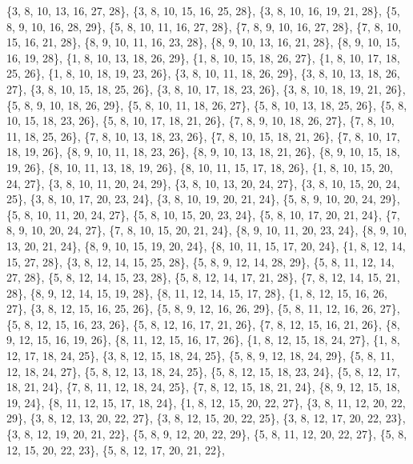 \documentclass[11pt,a4paper]{article}
\begin{document}
{\{3, 8, 10, 13, 16, 27, 28\}, \{3, 8, 10, 15, 16, 25, 28\}, \{3, 8, 10, 16, 19, 21, 28\}, \{5, 8, 9, 10, 16, 28, 29\}, \{5, 8, 10, 11, 16, 27, 28\},
\{7, 8, 9, 10, 16, 27, 28\}, \{7, 8, 10, 15, 16, 21, 28\}, \{8, 9, 10, 11, 16, 23, 28\}, \{8, 9, 10, 13, 16, 21, 28\}, \{8, 9, 10, 15, 16, 19, 28\},
\{1, 8, 10, 13, 18, 26, 29\}, \{1, 8, 10, 15, 18, 26, 27\}, \{1, 8, 10, 17, 18, 25, 26\}, \{1, 8, 10, 18, 19, 23, 26\}, \{3, 8, 10, 11, 18, 26, 29\},
\{3, 8, 10, 13, 18, 26, 27\}, \{3, 8, 10, 15, 18, 25, 26\}, \{3, 8, 10, 17, 18, 23, 26\}, \{3, 8, 10, 18, 19, 21, 26\}, \{5, 8, 9, 10, 18, 26, 29\},
\{5, 8, 10, 11, 18, 26, 27\}, \{5, 8, 10, 13, 18, 25, 26\}, \{5, 8, 10, 15, 18, 23, 26\}, \{5, 8, 10, 17, 18, 21, 26\}, \{7, 8, 9, 10, 18, 26, 27\},
\{7, 8, 10, 11, 18, 25, 26\}, \{7, 8, 10, 13, 18, 23, 26\}, \{7, 8, 10, 15, 18, 21, 26\}, \{7, 8, 10, 17, 18, 19, 26\}, \{8, 9, 10, 11, 18, 23, 26\},
\{8, 9, 10, 13, 18, 21, 26\}, \{8, 9, 10, 15, 18, 19, 26\}, \{8, 10, 11, 13, 18, 19, 26\}, \{8, 10, 11, 15, 17, 18, 26\}, \{1, 8, 10, 15, 20, 24, 27\},
\{3, 8, 10, 11, 20, 24, 29\}, \{3, 8, 10, 13, 20, 24, 27\}, \{3, 8, 10, 15, 20, 24, 25\}, \{3, 8, 10, 17, 20, 23, 24\}, \{3, 8, 10, 19, 20, 21, 24\},
\{5, 8, 9, 10, 20, 24, 29\}, \{5, 8, 10, 11, 20, 24, 27\}, \{5, 8, 10, 15, 20, 23, 24\}, \{5, 8, 10, 17, 20, 21, 24\}, \{7, 8, 9, 10, 20, 24, 27\},
\{7, 8, 10, 15, 20, 21, 24\}, \{8, 9, 10, 11, 20, 23, 24\}, \{8, 9, 10, 13, 20, 21, 24\}, \{8, 9, 10, 15, 19, 20, 24\}, \{8, 10, 11, 15, 17, 20, 24\},
\{1, 8, 12, 14, 15, 27, 28\}, \{3, 8, 12, 14, 15, 25, 28\}, \{5, 8, 9, 12, 14, 28, 29\}, \{5, 8, 11, 12, 14, 27, 28\}, \{5, 8, 12, 14, 15, 23, 28\},
\{5, 8, 12, 14, 17, 21, 28\}, \{7, 8, 12, 14, 15, 21, 28\}, \{8, 9, 12, 14, 15, 19, 28\}, \{8, 11, 12, 14, 15, 17, 28\}, \{1, 8, 12, 15, 16, 26, 27\},
\{3, 8, 12, 15, 16, 25, 26\}, \{5, 8, 9, 12, 16, 26, 29\}, \{5, 8, 11, 12, 16, 26, 27\}, \{5, 8, 12, 15, 16, 23, 26\}, \{5, 8, 12, 16, 17, 21, 26\},
\{7, 8, 12, 15, 16, 21, 26\}, \{8, 9, 12, 15, 16, 19, 26\}, \{8, 11, 12, 15, 16, 17, 26\}, \{1, 8, 12, 15, 18, 24, 27\}, \{1, 8, 12, 17, 18, 24, 25\},
\{3, 8, 12, 15, 18, 24, 25\}, \{5, 8, 9, 12, 18, 24, 29\}, \{5, 8, 11, 12, 18, 24, 27\}, \{5, 8, 12, 13, 18, 24, 25\}, \{5, 8, 12, 15, 18, 23, 24\},
\{5, 8, 12, 17, 18, 21, 24\}, \{7, 8, 11, 12, 18, 24, 25\}, \{7, 8, 12, 15, 18, 21, 24\}, \{8, 9, 12, 15, 18, 19, 24\}, \{8, 11, 12, 15, 17, 18, 24\},
\{1, 8, 12, 15, 20, 22, 27\}, \{3, 8, 11, 12, 20, 22, 29\}, \{3, 8, 12, 13, 20, 22, 27\}, \{3, 8, 12, 15, 20, 22, 25\}, \{3, 8, 12, 17, 20, 22, 23\},
\{3, 8, 12, 19, 20, 21, 22\}, \{5, 8, 9, 12, 20, 22, 29\}, \{5, 8, 11, 12, 20, 22, 27\}, \{5, 8, 12, 15, 20, 22, 23\}, \{5, 8, 12, 17, 20, 21, 22\},
}
\end{document}
